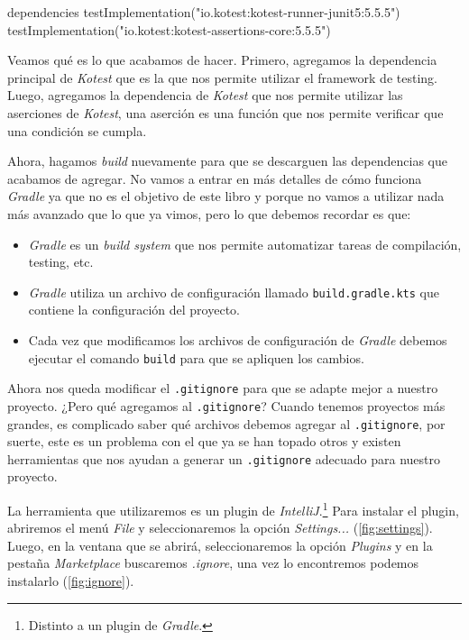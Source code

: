   \begin{kotlin}
    dependencies {
        testImplementation("io.kotest:kotest-runner-junit5:5.5.5")
        testImplementation("io.kotest:kotest-assertions-core:5.5.5")
    }
  \end{kotlin}

  Veamos qué es lo que acabamos de hacer.
  Primero, agregamos la dependencia principal de \textit{Kotest} que es la que nos permite
  utilizar el framework de testing.
  Luego, agregamos la dependencia de \textit{Kotest} que nos permite utilizar las aserciones de 
  \textit{Kotest}, una aserción es una función que nos permite verificar que una condición se 
  cumpla.

  Ahora, hagamos \textit{build} nuevamente para que se descarguen las dependencias que acabamos
  de agregar.
  No vamos a entrar en más detalles de cómo funciona \textit{Gradle} ya que no es el objetivo de
  este libro y porque no vamos a utilizar nada más avanzado que lo que ya vimos, pero lo que debemos
  recordar es que:

  \begin{itemize}
    \item \textit{Gradle} es un \textit{build system} que nos permite automatizar tareas de
      compilación, testing, etc.
    \item \textit{Gradle} utiliza un archivo de configuración llamado \texttt{build.gradle.kts}
      que contiene la configuración del proyecto.
    \item Cada vez que modificamos los archivos de configuración de \textit{Gradle} debemos
      ejecutar el comando \texttt{build} para que se apliquen los cambios.
  \end{itemize}

  Ahora nos queda modificar el \texttt{.gitignore} para que se adapte mejor a nuestro 
  proyecto.
  ¿Pero qué agregamos al \texttt{.gitignore}?
  Cuando tenemos proyectos más grandes, es complicado saber qué archivos debemos agregar al
  \texttt{.gitignore}, por suerte, este es un problema con el que ya se han topado otros y existen
  herramientas que nos ayudan a generar un \texttt{.gitignore} adecuado para nuestro proyecto.

  La herramienta que utilizaremos es un plugin de \textit{IntelliJ}.\footnote{
    Distinto a un plugin de \textit{Gradle}.
  }
  Para instalar el plugin, abriremos el menú \textit{File} y seleccionaremos la opción
  \textit{Settings...} (\cref{fig:settings}).
  Luego, en la ventana que se abrirá, seleccionaremos la opción \textit{Plugins} y en la pestaña
  \textit{Marketplace} buscaremos \textit{.ignore}, una vez lo encontremos podemos instalarlo
  (\cref{fig:ignore}).

